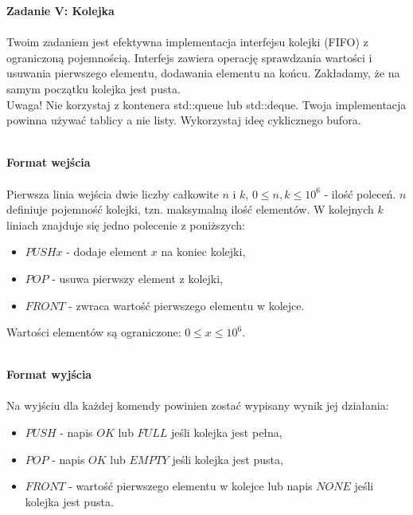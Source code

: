 \documentclass[
  fontsize=12pt  %
 ,english        %
 ,headinclude    %
 ,headsepline    %
]{scrbook}       %
\begin{document}
\vspace{50 mm}
\hspace{50 mm}
\newline

\par{\Large \textbf{Zadanie V: Kolejka}} \\ \\
Twoim zadaniem jest efektywna implementacja interfejsu kolejki (FIFO) z ograniczoną pojemnością. Interfejs zawiera operację sprawdzania wartości i usuwania pierwszego elementu, dodawania elementu na końcu. Zakładamy, że na samym początku kolejka jest pusta.
\\
Uwaga! Nie korzystaj z kontenera std::queue lub std::deque. Twoja implementacja powinna używać tablicy a nie listy. Wykorzystaj ideę cyklicznego bufora.
\\ \\
\par{\Large \textbf{Format wejścia}} \\ \\
Pierwsza linia wejścia dwie liczby całkowite $n$ i $k$, $0 \leq n, k \leq 10^6$ - ilość poleceń. $n$ definiuje pojemność kolejki, tzn. maksymalną ilość elementów. W kolejnych $k$ liniach znajduje się jedno polecenie z poniższych:
\begin{itemize}
  \item $PUSH x$ - dodaje element $x$ na koniec kolejki,
  \item $POP$ - usuwa pierwszy element z kolejki,
  \item $FRONT$ - zwraca wartość pierwszego elementu w kolejce.
\end{itemize}

Wartości elementów są ograniczone: $0 \leq x \leq 10^6$.
\\ \\
\par{\Large \textbf{Format wyjścia}} \\ \\
Na wyjściu dla każdej komendy powinien zostać wypisany wynik jej działania:
\begin{itemize}
  \item $PUSH$ - napis $OK$ lub $FULL$ jeśli kolejka jest pełna,
  \item $POP$ - napis $OK$ lub $EMPTY$ jeśli kolejka jest pusta,
  \item $FRONT$ - wartość pierwszego elementu w kolejce lub napis $NONE$ jeśli kolejka jest pusta.
\end{itemize}
\end{document}
